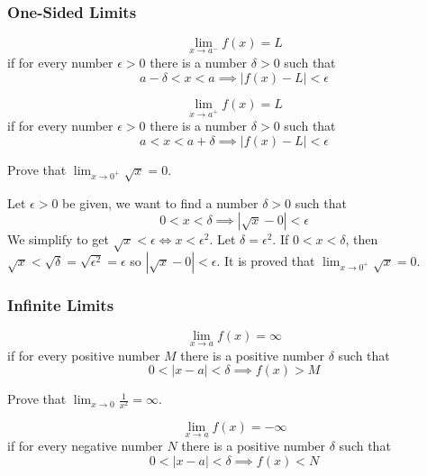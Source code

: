 \subsubsection*{One-Sided Limits}
\begin{definition}
    \[\lim_{x\to a^-}f(x)=L\]
    if for every number \(\epsilon>0\) there is a number \(\delta>0\) such
    that
    \[a-\delta<x<a\implies|f(x)-L|<\epsilon\]
\end{definition}
\begin{definition}
    \[\lim_{x\to a^+}f(x)=L\]
    if for every number \(\epsilon>0\) there is a number \(\delta>0\) such
    that
    \[a<x<a+\delta\implies|f(x)-L|<\epsilon\]
\end{definition}
\begin{problem}
    Prove that \(\displaystyle{\lim_{x\to 0^+}\sqrt{x}=0}\).
\end{problem}
\begin{solution}
    Let \(\epsilon>0\) be given, we want to find a number \(\delta>0\) such
    that
    \[0<x<\delta\implies|\sqrt{x}-0|<\epsilon\]
    We simplify to get \(\sqrt{x}<\epsilon\iff x<\epsilon^2\).
    Let \(\delta=\epsilon^2\).
    If \(0<x<\delta\), then
    \(\sqrt{x}<\sqrt{\delta}=\sqrt{\epsilon^2}=\epsilon\)
    so \(|\sqrt{x}-0|<\epsilon\).
    It is proved that \(\displaystyle{\lim_{x\to 0^+}\sqrt{x}=0}\).
\end{solution}

\subsubsection*{Infinite Limits}
\begin{definition}
    \[\lim_{x\to a}f(x)=\infty\]
    if for every positive number \(M\) there is a positive number \(\delta\)
    such that
    \[0<|x-a|<\delta\implies f(x)>M\]
\end{definition}
\begin{problem}
    Prove that \(\displaystyle{\lim_{x\to 0}\frac{1}{x^2}=\infty}\).
\end{problem}
\begin{definition}
    \[\lim_{x\to a}f(x)=-\infty\]
    if for every negative number \(N\) there is a positive number \(\delta\)
    such that
    \[0<|x-a|<\delta\implies f(x)<N\]
\end{definition}